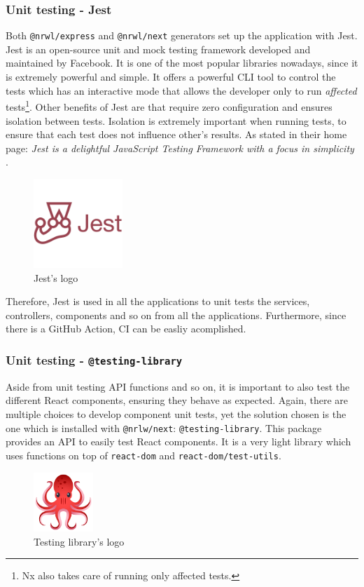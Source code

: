 \documentclass[a4paper, 12pt, oneside]{book}
\begin{document}
\subsubsection{Unit testing - Jest}
Both \texttt{@nrwl/express} and \texttt{@nrwl/next} generators set up the application with Jest. Jest is an open-source unit and mock testing framework developed and maintained by Facebook. It is one of the most popular libraries nowadays, since it is extremely powerful and simple. It offers a powerful CLI tool to control the tests which has an interactive mode that allows the developer only to run \emph{affected} tests\footnote{Nx also takes care of running only affected tests.}. Other benefits of Jest are that require zero configuration and ensures isolation between tests. Isolation is extremely important when running tests, to ensure that each test does not influence other's results. As stated in their home page: \emph{Jest is a delightful JavaScript Testing Framework with a focus in simplicity} \cite{jest}.
\begin{figure}[H]
	\centering
	\includegraphics[width=0.3\textwidth]{assets/jest-logo.png}
	\caption{Jest's logo}
\end{figure}
Therefore, Jest is used in all the applications to unit tests the services, controllers, components and so on from all the applications. Furthermore, since there is a GitHub Action, CI can be easliy acomplished.
\subsubsection{Unit testing - \texttt{@testing-library}}
Aside from unit testing API functions and so on, it is important to also test the different React components, ensuring they behave as expected. Again, there are multiple choices to develop component unit tests, yet the solution chosen is the one which is installed with \texttt{@nrlw/next}: \texttt{@testing-library}. This package provides an API to easily test React components. It is a very light library which uses functions on top of \texttt{react-dom} and \texttt{react-dom/test-utils}.
\begin{figure}[H]
	\centering
	\includegraphics[width=0.2\textwidth]{assets/testing-library-logo.png}
	\caption{Testing library's logo}
\end{figure}
\end{document}
